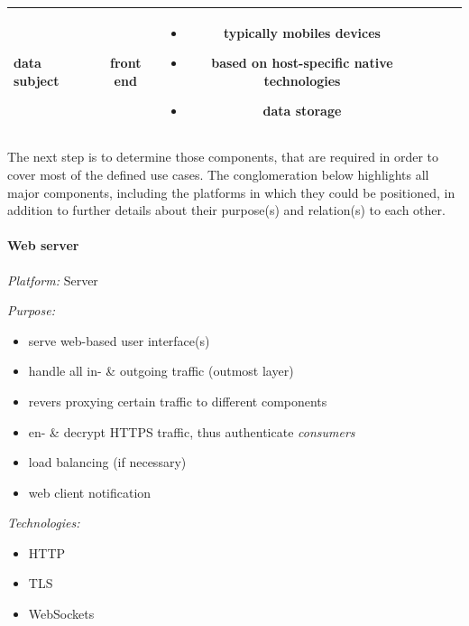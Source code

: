 \documentclass[12pt,english,a4paper,titlepage,cleardoublepage=empty,dottedtoc]{report}
\providecommand{\tightlist}{%
  \setlength{\itemsep}{0pt}\setlength{\parskip}{0pt}}
\begin{document}
\begin{longtable}[]{@{}lccccl@{}}
\begin{minipage}[t]{0.16\columnwidth}
data subject\strut
\end{minipage} & \begin{minipage}[t]{0.16\columnwidth}\centering\strut
front end\strut
\end{minipage} & \begin{minipage}[t]{0.16\columnwidth}\raggedright\strut
\begin{itemize}
\tightlist
\item
  typically mobiles devices
\item
  based on host-specific native technologies
\item
  data storage
\end{itemize}\strut
\end{minipage}\tabularnewline
\bottomrule
\end{longtable}

The next step is to determine those components, that are required in
order to cover most of the defined use cases. The conglomeration below
highlights all major components, including the platforms in which they
could be positioned, in addition to further details about their
purpose(s) and relation(s) to each other.

\paragraph{Web server}\label{web-server}

\emph{Platform:} Server

\emph{Purpose:}

\begin{itemize}
\tightlist
\item
  serve web-based user interface(s)
\item
  handle all in- \& outgoing traffic (outmost layer)
\item
  revers proxying certain traffic to different components
\item
  en- \& decrypt HTTPS traffic, thus authenticate \emph{consumers}
\item
  load balancing (if necessary)
\item
  web client notification
\end{itemize}

\emph{Technologies:}

\begin{itemize}
\tightlist
\item
  HTTP
\item
  TLS
\item
  WebSockets
\end{itemize}
\end{document}
